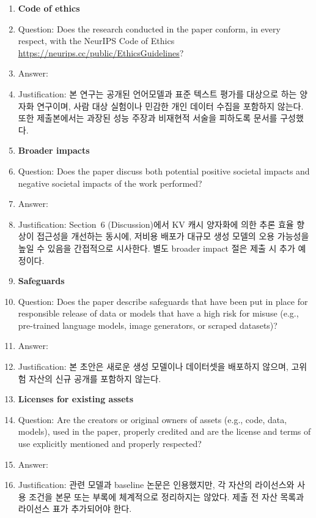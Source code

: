 \begin{enumerate}
\item {\bf Code of ethics}
    \item[] Question: Does the research conducted in the paper conform, in every respect, with the NeurIPS Code of Ethics \url{https://neurips.cc/public/EthicsGuidelines}?
    \item[] Answer: \answerYes{}
    \item[] Justification: 본 연구는 공개된 언어모델과 표준 텍스트 평가를 대상으로 하는 양자화 연구이며, 사람 대상 실험이나 민감한 개인 데이터 수집을 포함하지 않는다. 또한 제출본에서는 과장된 성능 주장과 비재현적 서술을 피하도록 문서를 구성했다.

\item {\bf Broader impacts}
    \item[] Question: Does the paper discuss both potential positive societal impacts and negative societal impacts of the work performed?
    \item[] Answer: \answerYes{}
    \item[] Justification: Section~6 (Discussion)에서 KV 캐시 양자화에 의한 추론 효율 향상이 접근성을 개선하는 동시에, 저비용 배포가 대규모 생성 모델의 오용 가능성을 높일 수 있음을 간접적으로 시사한다. 별도 broader impact 절은 제출 시 추가 예정이다.
    
\item {\bf Safeguards}
    \item[] Question: Does the paper describe safeguards that have been put in place for responsible release of data or models that have a high risk for misuse (e.g., pre-trained language models, image generators, or scraped datasets)?
    \item[] Answer: \answerNA{}
    \item[] Justification: 본 초안은 새로운 생성 모델이나 데이터셋을 배포하지 않으며, 고위험 자산의 신규 공개를 포함하지 않는다.

\item {\bf Licenses for existing assets}
    \item[] Question: Are the creators or original owners of assets (e.g., code, data, models), used in the paper, properly credited and are the license and terms of use explicitly mentioned and properly respected?
    \item[] Answer: \answerNo{}
    \item[] Justification: 관련 모델과 baseline 논문은 인용했지만, 각 자산의 라이선스와 사용 조건을 본문 또는 부록에 체계적으로 정리하지는 않았다. 제출 전 자산 목록과 라이선스 표가 추가되어야 한다.


\end{enumerate}
